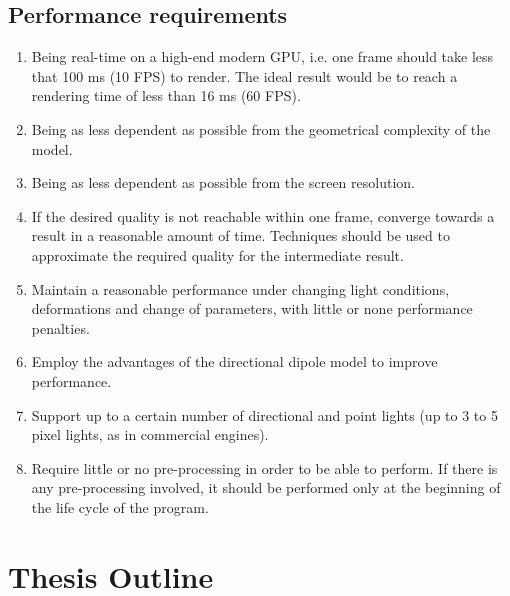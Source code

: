 \subsection{Performance requirements}
\begin{enumerate}
\setlength{\itemsep}{-1pt}
	\item Being real-time on a high-end modern GPU, i.e. one frame should take less that 100 ms (10 FPS) to render. The ideal result would be to reach a rendering time of less than 16 ms (60 FPS).
	\item Being as less dependent as possible from the geometrical complexity of the model.
	\item Being as less dependent as possible from the screen resolution.
	\item If the desired quality is not reachable within one frame, converge towards a result in a reasonable amount of time. Techniques should be used to approximate the required quality for the intermediate result. 
	\item Maintain a reasonable performance under changing light conditions, deformations and change of parameters, with little or none performance penalties.
	\item Employ the advantages of the directional dipole model to improve performance.
	\item Support up to a certain number of directional and point lights (up to 3 to 5 pixel lights, as in commercial engines\citep{unitymanual}).
	\item Require little or no pre-processing in order to be able to perform. If there is any pre-processing involved, it should be performed only at the beginning of the life cycle of the program. 
\end{enumerate}

%

\section{Thesis Outline}

